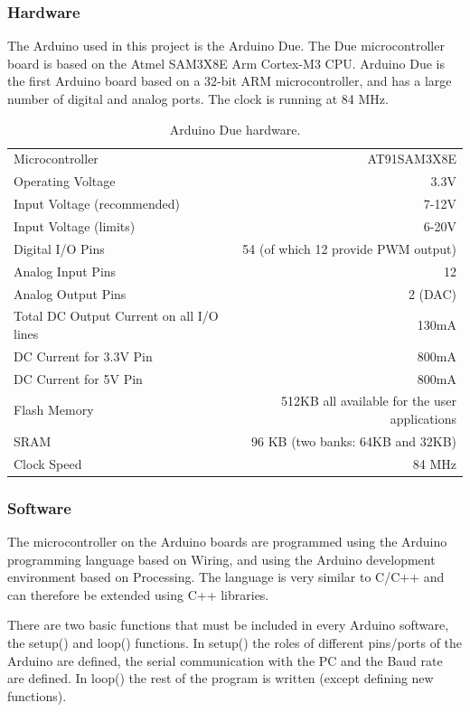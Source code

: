 \subsubsection{Hardware}
The Arduino used in this project is the Arduino Due. The Due microcontroller board is 
based on the Atmel SAM3X8E Arm Cortex-M3 CPU. Arduino Due is the first Arduino board 
based on a 32-bit ARM microcontroller, and has a large number of digital and analog ports. 
The clock is running at 84 MHz.\cite{ArduinoDue}
\begin{table}
	\caption{Arduino Due hardware.}
	\begin{tabular}{l | r}

		Microcontroller 							&	AT91SAM3X8E \\
		Operating Voltage 							&	3.3V \\
		Input Voltage (recommended)					&	7-12V \\
		Input Voltage (limits)						&	6-20V \\
		Digital I/O Pins 							&	54 (of which 12 provide PWM output) \\
		Analog Input Pins 							&	12 \\
		Analog Output Pins 							&	2 (DAC) \\
		Total DC Output Current on all I/O lines 	&	130mA \\
		DC Current for 3.3V Pin 					&	800mA \\
		DC Current for 5V Pin 						&	800mA \\
		Flash Memory 								&	512KB all available for the user applications\\
		SRAM										&	96 KB (two banks: 64KB and 32KB) \\
		Clock Speed 								&	84 MHz \\

	\end{tabular}
\end{table}

\newpage
\subsubsection{Software}
The microcontroller on the Arduino boards are programmed using the Arduino programming 
language based on Wiring, and using the Arduino development environment based on Processing.
The language is very similar to C/C++ and can therefore be extended using C++ libraries.

There are two basic functions that must be included in every Arduino software, 
the setup() and loop() functions. In setup() the roles of different pins/ports of the Arduino 
are defined, the serial communication with the PC and the Baud rate are defined. In loop() 
the rest of the program is written (except defining new functions).

